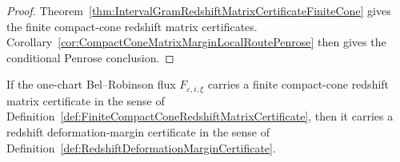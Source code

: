 \begin{proof}
Theorem~\ref{thm:IntervalGramRedshiftMatrixCertificateFiniteCone} gives the
finite compact-cone redshift matrix certificates.  Corollary~\ref{cor:CompactConeMatrixMarginLocalRoutePenrose}
then gives the conditional Penrose conclusion.
\end{proof}

\begin{theorem}\label{thm:FiniteCompactConeMatrixMarginDeformationMargin}
If the one-chart Bel--Robinson flux $F_{\varepsilon,i,\xi}$ carries a finite
compact-cone redshift matrix certificate in the sense of
Definition~\ref{def:FiniteCompactConeRedshiftMatrixCertificate}, then it carries
a redshift deformation-margin certificate in the sense of
Definition~\ref{def:RedshiftDeformationMarginCertificate}.
\end{theorem}

